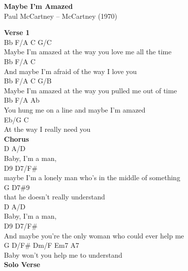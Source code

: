\documentclass[a4paper]{article}
\begin{document}
    \begin{center}
        \textbf{Maybe I'm Amazed}
        ~\\
        Paul McCartney -- McCartney (1970)
    \end{center}
    {
        \scriptsize
        \textbf{Verse 1}
        ~\\
        {
            \cutive
            \obeyspaces
Bb          F/A                   C               G/C
\\
 Maybe I'm amazed at the way you love me all the time
\\
Bb               F/A                C
\\
 And maybe I'm afraid of the way I love you
\\
Bb          F/A                   C                G/B
\\
 Maybe I'm amazed at the way you pulled me out of time
\\
    Bb           F/A       Ab
\\
You hung me on a line and maybe I'm amazed
\\
   Eb/G             C
\\
At the way I really need you
\\

        }
        \textbf{Chorus}
        ~\\
        {
            \cutive
            \obeyspaces
D            A/D
\\
 Baby, I'm a man,
\\
            D9                                D7/F\#
\\
maybe I'm a lonely man who's in the middle of something
\\
G                              D7\#9
\\
 that he doesn't really understand
\\
D            A/D
\\
 Baby, I'm a man,
\\
                     D9                        D7/F\#
\\
And maybe you're the only woman who could ever help me
\\
G                               D/F\#   Dm/F   Em7   A7
\\
 Baby won't you help me to understand
\\

        }
        \textbf{Solo Verse}
        ~\\
        {
            \cutive
            \obeyspaces

}}
\end{document}
